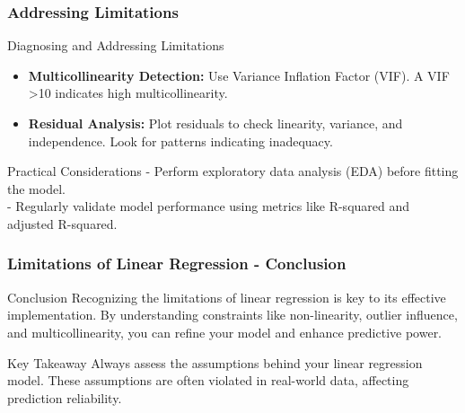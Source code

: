 \documentclass[aspectratio=169]{beamer}
\begin{document}
\begin{frame}[fragile]
    \frametitle{Addressing Limitations}
    \begin{block}{Diagnosing and Addressing Limitations}
        \begin{itemize}
            \item \textbf{Multicollinearity Detection:} 
                Use Variance Inflation Factor (VIF). A VIF \textgreater 10 indicates high multicollinearity.
            
            \item \textbf{Residual Analysis:} 
                Plot residuals to check linearity, variance, and independence. Look for patterns indicating inadequacy.
        \end{itemize}
    \end{block}
    
    \begin{block}{Practical Considerations}
        - Perform exploratory data analysis (EDA) before fitting the model. \\
        - Regularly validate model performance using metrics like R-squared and adjusted R-squared.
    \end{block}
\end{frame}

\begin{frame}[fragile]
    \frametitle{Limitations of Linear Regression - Conclusion}
    \begin{block}{Conclusion}
        Recognizing the limitations of linear regression is key to its effective implementation. 
        By understanding constraints like non-linearity, outlier influence, and multicollinearity, 
        you can refine your model and enhance predictive power.
    \end{block}
    
    \begin{block}{Key Takeaway}
        Always assess the assumptions behind your linear regression model. 
        These assumptions are often violated in real-world data, affecting prediction reliability.
    \end{block}
\end{frame}
\end{document}
